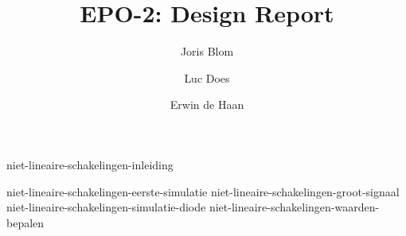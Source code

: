 \documentclass{report}
\title{EPO-2: Design Report}
\author{Joris Blom \and Luc Does \and Erwin de Haan}
\begin{document}
\maketitle
\newpage
{}

{niet-lineaire-schakelingen-inleiding}
\tableofcontents

\newpage
{}

{niet-lineaire-schakelingen-eerste-simulatie}
{niet-lineaire-schakelingen-groot-signaal}
{niet-lineaire-schakelingen-simulatie-diode}
{niet-lineaire-schakelingen-waarden-bepalen}


\printbibliography
\end{document}
